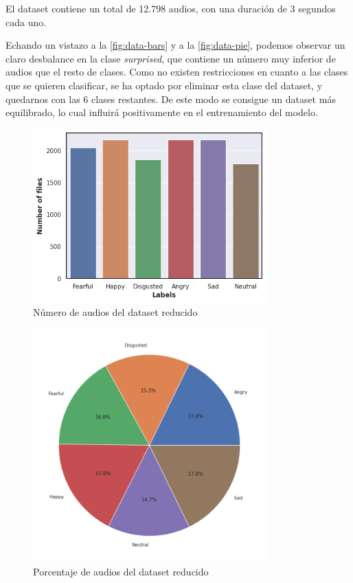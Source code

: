 El dataset contiene un total de 12.798 audios, con una duración de 3 segundos cada uno.

Echando un vistazo a la \autoref{fig:data-bars} y a la \autoref{fig:data-pie}, podemos observar un claro desbalance en la clase \textit{surprised}, que contiene un número muy inferior de audios que el resto de clases.
Como no existen restricciones en cuanto a las clases que se quieren clasificar, se ha optado por eliminar esta clase del dataset, y quedarnos con las 6 clases restantes.
De este modo se consigue un dataset más equilibrado, lo cual influirá positivamente en el entrenamiento del modelo.

\begin{figure}[H]
    \centering
    \includegraphics[width=0.8\textwidth]{cap2/images/dataset-bars-small.png}
    \caption{Número de audios del dataset reducido}
    \label{fig:data-bars-small}
\end{figure}

\begin{figure}[H]
    \centering
    \includegraphics[width=0.8\textwidth]{cap2/images/dataset-pie-small.png}
    \caption{Porcentaje de audios del dataset reducido}
    \label{fig:data-pie-small}
\end{figure}

